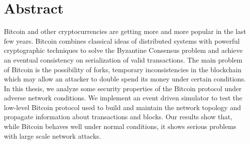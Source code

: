 \chapter*{Abstract}
Bitcoin and other cryptocurrencies are getting more and more popular in the last few years.
Bitcoin combines classical ideas of distributed systems with powerful cryptographic techniques to solve the Byzantine Consensus problem and achieve an eventual consistency on serialization of valid transactions.
The main problem of Bitcoin is the possibility of forks, temporary inconsistencies in the blockchain which may allow an attacker to double spend its money under certain conditions.
In this thesis, we analyze some security properties of the Bitcoin protocol under adverse network conditions.
We implement an event driven simulator to test the low-level Bitcoin protocol used to build and maintain the network topology and propagate information about transactions and blocks.
Our results show that, while Bitcoin behaves well under normal conditions, it shows serious problems with large scale network attacks.
